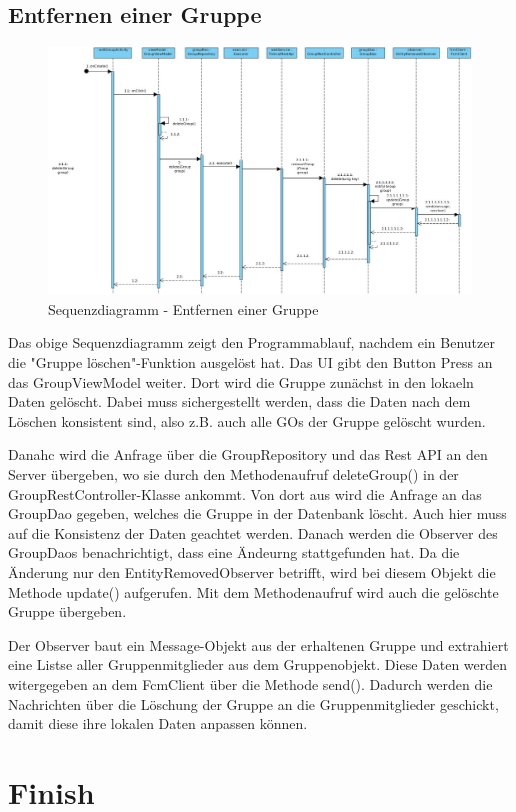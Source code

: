 \subsection{Entfernen einer Gruppe}

\begin{figure}[H]
	\centering
	\includegraphics[width=1\textwidth]{../Sequenzdiagramme/deleteGroup_sequenz.jpg}
	\caption{Sequenzdiagramm - Entfernen einer Gruppe}
\end{figure}

Das obige Sequenzdiagramm zeigt den Programmablauf, nachdem ein Benutzer die "Gruppe löschen"-Funktion ausgelöst hat. Das UI gibt den Button Press an das GroupViewModel weiter. Dort wird die Gruppe zunächst in den lokaeln Daten gelöscht. Dabei muss sichergestellt werden, dass die Daten nach dem Löschen konsistent sind, also z.B. auch alle GOs der Gruppe gelöscht wurden.

Danahc wird die Anfrage über die GroupRepository und das Rest API an den Server übergeben, wo sie durch den Methodenaufruf deleteGroup() in der GroupRestController-Klasse ankommt. Von dort aus wird die Anfrage an das GroupDao gegeben, welches die Gruppe in der Datenbank löscht. Auch hier muss auf die Konsistenz der Daten geachtet werden. Danach werden die Observer des GroupDaos benachrichtigt, dass eine Ändeurng stattgefunden hat. Da die Änderung nur den EntityRemovedObserver betrifft, wird bei diesem Objekt die Methode update() aufgerufen. Mit dem Methodenaufruf wird auch die gelöschte Gruppe übergeben.

Der Observer baut ein Message-Objekt aus der erhaltenen Gruppe und extrahiert eine Listse aller Gruppenmitglieder aus dem Gruppenobjekt. Diese Daten werden witergegeben an dem FcmClient über die Methode send(). Dadurch werden die Nachrichten über die Löschung der Gruppe an die Gruppenmitglieder geschickt, damit diese ihre lokalen Daten anpassen können.

\section{Finish}{

}
